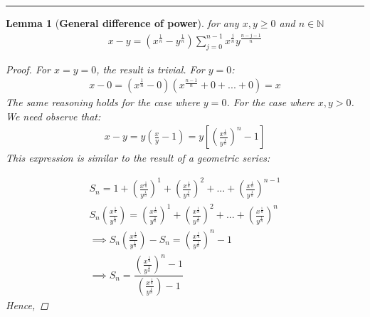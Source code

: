 \documentclass[12pt]{book}
\newtheorem{lemma}{Lemma}
\theoremstyle{definition}
\begin{document}
\noindent\rule{\textwidth}{1pt}
\begin{lemma}[\textbf{General difference of power}]
\label{lem_gen_diff_power}
for any $x,y \geq 0$ and $n \in \mathbb{N}$
\begin{align*}
x-y = (x^{\frac{1}{n}}-y^{\frac{1}{n}})\sum_{j=0}^{n-1}x^{\frac{j}{n}}y^{\frac{n - j -1}{n}}	
\end{align*}
\begin{proof}
For $x = y =0$, the result is trivial. For $y=0$:
\begin{align*}
x - 0 =(x^{\frac{1}{n}} -0)(x^{\frac{n-1}{n}}+0+...+0) = x	
\end{align*}
The same reasoning holds for the case where $y=0$. For the case where $x,y > 0$. We need observe that:
\begin{align*}
x-y =y\left(\frac{x}{y}-1\right) = 	y\left[\left(\frac{x^{\frac{1}{n}}}{y^{\frac{1}{n}}}\right)^{n}-1\right]
\end{align*}
This expression is similar to the result of a geometric series:

\begingroup
\addtolength{\jot}{1em}
\begin{align*}
S_n =1+	\left(\frac{x^{\frac{1}{n}}}{y^{\frac{1}{n}}}\right)^{1} + \left(\frac{x^{\frac{1}{n}}}{y^{\frac{1}{n}}}\right)^{2}+ ...+ \left(\frac{x^{\frac{1}{n}}}{y^{\frac{1}{n}}}\right)^{n-1} \\
	S_n\left(\frac{x^{\frac{1}{n}}}{y^{\frac{1}{n}}}\right) = \left(\frac{x^{\frac{1}{n}}}{y^{\frac{1}{n}}}\right)^{1} + \left(\frac{x^{\frac{1}{n}}}{y^{\frac{1}{n}}}\right)^{2}+ ...+ \left(\frac{x^{\frac{1}{n}}}{y^{\frac{1}{n}}}\right)^{n}\\
	\implies S_n\left(\frac{x^{\frac{1}{n}}}{y^{\frac{1}{n}}}\right) - S_n = \left(\frac{x^{\frac{1}{n}}}{y^{\frac{1}{n}}}\right)^{n} -1\\
	\implies S_n= \dfrac{\left(\frac{x^{\frac{1}{n}}}{y^{\frac{1}{n}}}\right)^{n} -1}{\left(\frac{x^{\frac{1}{n}}}{y^{\frac{1}{n}}}\right) -1}
\end{align*}
\endgroup
Hence,


\end{proof}
\end{lemma}
\end{document}
